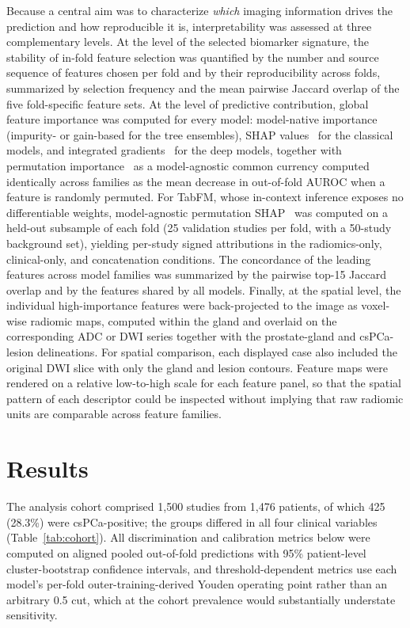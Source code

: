 \documentclass[11pt]{article}
\begin{document}
Because a central aim was to characterize \emph{which} imaging information drives
the prediction and how reproducible it is, interpretability was assessed at three
complementary levels. At the level of the selected biomarker signature, the
stability of in-fold feature selection was quantified by the number and source
sequence of features chosen per fold and by their reproducibility across folds,
summarized by selection frequency and the mean pairwise Jaccard overlap of the
five fold-specific feature sets. At the level of predictive contribution, global
feature importance was computed for every model: model-native importance
(impurity- or gain-based for the tree ensembles), SHAP
values~\citep{lundberg2017unified} for the classical models, and integrated
gradients~\citep{sundararajan2017axiomatic} for the deep models, together with
permutation importance~\citep{fisher2019all} as a model-agnostic common currency
computed identically across families as the mean decrease in out-of-fold AUROC
when a feature is randomly permuted. For TabFM, whose in-context inference
exposes no differentiable weights, model-agnostic permutation
SHAP~\citep{lundberg2017unified} was computed on a held-out subsample of each
fold (25 validation studies per fold, with a 50-study background set), yielding
per-study signed attributions in the radiomics-only, clinical-only, and
concatenation conditions. The concordance of the leading features
across model families was summarized by the pairwise top-15 Jaccard overlap and
by the features shared by all models. Finally, at the spatial level, the
individual high-importance features were back-projected to the image as
voxel-wise radiomic maps, computed within the gland and overlaid on the
corresponding ADC or DWI series together with the prostate-gland and
csPCa-lesion delineations. For spatial comparison, each displayed case also
included the original DWI slice with only the gland and lesion contours. Feature
maps were rendered on a relative low-to-high scale for each feature panel, so
that the spatial pattern of each descriptor could be inspected without implying
that raw radiomic units are comparable across feature families.

\section{Results}
\label{sec:results}

The analysis cohort comprised 1{,}500 studies from 1{,}476 patients, of which
425 (28.3\%) were csPCa-positive; the groups differed in all four clinical
variables (Table~\ref{tab:cohort}). All discrimination and calibration metrics
below were computed on aligned pooled out-of-fold predictions with 95\%
patient-level cluster-bootstrap confidence intervals, and threshold-dependent
metrics use each model's per-fold outer-training-derived Youden operating point
rather than an arbitrary 0.5 cut, which at the cohort prevalence would
substantially understate sensitivity.
\end{document}

